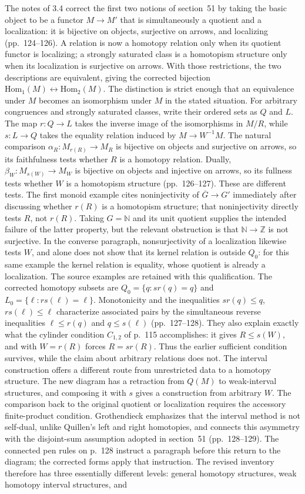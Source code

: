 \documentclass[10pt,oneside]{book}
\begin{document}
The notes of 3.4 correct the first two notions of section~51 by taking the basic object to be a functor $M\to M'$ that is simultaneously a quotient and a localization: it is bijective on objects, surjective on arrows, and localizing (pp.~124--126). A relation is now a homotopy relation only when its quotient functor is localizing; a strongly saturated class is a homotopism structure only when its localization is surjective on arrows. With those restrictions, the two descriptions are equivalent, giving the corrected bijection $\mathrm{Hom}_1(M)\leftrightarrow\mathrm{Hom}_2(M)$. The distinction is strict enough that an equivalence under $M$ becomes an isomorphism under $M$ in the stated situation. For arbitrary congruences and strongly saturated classes, write their ordered sets as $Q$ and $L$. The map $r:Q\to L$ takes the inverse image of the isomorphisms in $M/R$, while $s:L\to Q$ takes the equality relation induced by $M\to W^{-1}M$. The natural comparison $\alpha_R:M_{r(R)}\to M_R$ is bijective on objects and surjective on arrows, so its faithfulness tests whether $R$ is a homotopy relation. Dually, $\beta_W:M_{s(W)}\to M_W$ is bijective on objects and injective on arrows, so its fullness tests whether $W$ is a homotopism structure (pp.~126--127). These are different tests. The first monoid example cites noninjectivity of $\overline G\to G'$ immediately after discussing whether $r(R)$ is a homotopism structure; that noninjectivity directly tests $R$, not $r(R)$. Taking $G=\mathbb N$ and its unit quotient supplies the intended failure of the latter property, but the relevant obstruction is that $\mathbb N\to\mathbb Z$ is not surjective. In the converse paragraph, nonsurjectivity of a localization likewise tests $W$, and alone does not show that its kernel relation is outside $Q_0$: for this same example the kernel relation is equality, whose quotient is already a localization. The source examples are retained with this qualification. The corrected homotopy subsets are $Q_0=\{q:sr(q)=q\}$ and $L_0=\{\ell:rs(\ell)=\ell\}$. Monotonicity and the inequalities $sr(q)\le q$, $rs(\ell)\le\ell$ characterize associated pairs by the simultaneous reverse inequalities $\ell\le r(q)$ and $q\le s(\ell)$ (pp.~127--128). They also explain exactly what the cylinder condition $C_{1,2}$ of p.~115 accomplishes: it gives $R\le s(W)$, and with $W=r(R)$ forces $R=sr(R)$. Thus the earlier sufficient condition survives, while the claim about arbitrary relations does not. The interval construction offers a different route from unrestricted data to a homotopy structure. The new diagram has a retraction from $Q(M)$ to weak-interval structures, and composing it with $s$ gives a construction from arbitrary $W$. The comparison back to the original quotient or localization requires the accessory finite-product condition. Grothendieck emphasizes that the interval method is not self-dual, unlike Quillen's left and right homotopies, and connects this asymmetry with the disjoint-sum assumption adopted in section~51 (pp.~128--129). The connected pen rules on p.~128 instruct a paragraph before this return to the diagram; the corrected forms apply that instruction. The revised inventory therefore has three essentially different levels: general homotopy structures, weak homotopy interval structures, and 
\end{document}
